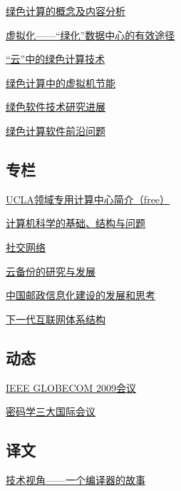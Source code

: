 \documentclass[a4paper]{article}
\begin{document}
\href{http://history.ccf.org.cn/resources/1190201776262/2010/04/23/20103-3.pdf}{绿色计算的概念及内容分析}

\href{http://history.ccf.org.cn/resources/1190201776262/2010/04/23/20103-4.pdf}{虚拟化——“绿化”数据中心的有效途径}

\href{http://history.ccf.org.cn/resources/1190201776262/2010/04/23/20103-5.pdf}{“云”中的绿色计算技术}

\href{http://history.ccf.org.cn/resources/1190201776262/2010/04/23/20103-6.pdf}{绿色计算中的虚拟机节能}

\href{http://history.ccf.org.cn/resources/1190201776262/2010/04/23/20103-7.pdf}{绿色软件技术研究进展}

\href{http://history.ccf.org.cn/resources/1190201776262/2010/04/23/20103-8.pdf}{绿色计算软件前沿问题}

\subsection{专栏}
\href{http://history.ccf.org.cn/resources/1190201776262/2010/04/23/20103-9.pdf}{UCLA领域专用计算中心简介（free）}

\href{http://history.ccf.org.cn/resources/1190201776262/2010/04/23/20103-10.pdf}{计算机科学的基础、结构与问题}

\href{http://history.ccf.org.cn/resources/1190201776262/2010/04/23/20103-11.pdf}{社交网络}

\href{http://history.ccf.org.cn/resources/1190201776262/2010/04/23/20103-12.pdf}{云备份的研究与发展}

\href{http://history.ccf.org.cn/resources/1190201776262/2010/04/23/20103-13.pdf}{中国邮政信息化建设的发展和思考}

\href{http://history.ccf.org.cn/resources/1190201776262/2010/04/23/20103-14.pdf}{下一代互联网体系结构}

\subsection{动态}
\href{http://history.ccf.org.cn/resources/1190201776262/2010/04/23/20103-15.pdf}{IEEE GLOBECOM 2009会议}

\href{http://history.ccf.org.cn/resources/1190201776262/2010/04/23/20103-16.pdf}{密码学三大国际会议}

\subsection{译文}
\href{http://history.ccf.org.cn/resources/1190201776262/2010/04/23/20103-17.pdf}{技术视角——一个编译器的故事}
\end{document}
